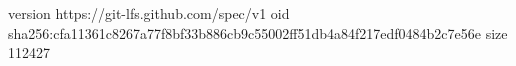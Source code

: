 version https://git-lfs.github.com/spec/v1
oid sha256:cfa11361c8267a77f8bf33b886cb9c55002ff51db4a84f217edf0484b2c7e56e
size 112427
